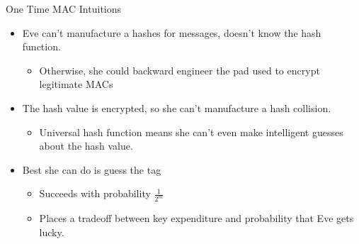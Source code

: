 \documentclass[pdf]{beamer}
\begin{document}
\begin{frame}{One Time MAC Intuitions}
  \begin{itemize}
  \item Eve can't manufacture a hashes for messages, doesn't know
    the hash function.
    \begin{itemize}
    \item Otherwise, she could backward engineer the pad used to encrypt legitimate MACs
    \end{itemize}
  \pause\item The hash value is encrypted, so she can't manufacture a hash collision.
    \begin{itemize}
    \item Universal hash function means she can't even make intelligent guesses
      about the hash value.
    \end{itemize}
  \pause\item Best she can do is guess the tag
    \begin{itemize}
    \item Succeeds with probability $\frac{1}{2^m}$
    \item Places a tradeoff between key expenditure and probability that Eve
      gets lucky.
    \end{itemize}
  \end{itemize}
\end{frame}
\end{document}
